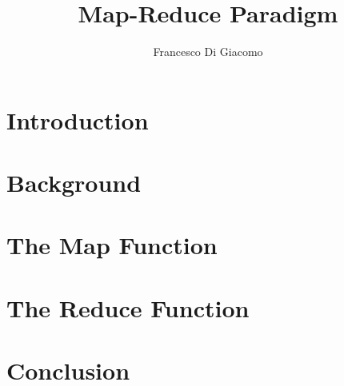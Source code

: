 \documentclass[10pt,a4paper]{article}
\author{Francesco Di Giacomo}
\date { }
\title{Map-Reduce Paradigm}
\begin{document}
	\maketitle
	\section{Introduction}
	\label{sec:intro}
	
	
	\section{Background}
	\label{sec:background}
	
		
	\section{The Map Function}
	\label{sec:map}
	
	
	\section{The Reduce Function}
	\label{sec:reduce}
	
	
	\section{Conclusion}
	\label{sec:conclusion}
	
\end{document}
